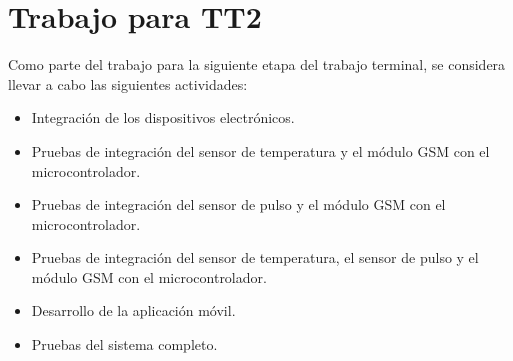 
\section{Trabajo para TT2}

Como parte del trabajo para la siguiente etapa del trabajo terminal, se considera llevar a cabo las siguientes actividades:

\begin{itemize}
	\item Integración de los dispositivos electrónicos.
	\item Pruebas de integración del sensor de temperatura y el módulo GSM con el microcontrolador.
	\item Pruebas de integración del sensor de pulso y el módulo GSM con el microcontrolador.
	\item Pruebas de integración del sensor de temperatura, el sensor de pulso y el módulo GSM con el microcontrolador.
	\item Desarrollo de la aplicación móvil.
	\item Pruebas del sistema completo.
\end{itemize}